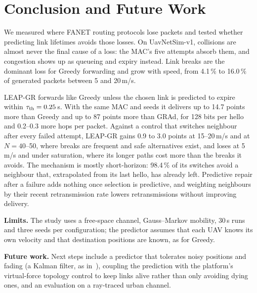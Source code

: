 \section{Conclusion and Future Work}
\label{sec:conclusion}

We measured where FANET routing protocols lose packets and tested whether predicting link lifetimes avoids
those losses. On UavNetSim-v1, collisions are almost never the final cause of a loss: the MAC's five attempts
absorb them, and congestion shows up as queueing and expiry instead. Link breaks are the dominant loss for
Greedy forwarding and grow with speed, from 4.1\,\% to 16.0\,\% of generated packets between 5 and 20\,m/s.

LEAP-GR forwards like Greedy unless the chosen link is predicted to expire within $\tau_{\mathrm{th}}=0.25$\,s. With the
same MAC and seeds it delivers up to 14.7 points more than Greedy and up to 87 points more than GRAd, for
128 bits per hello and 0.2--0.3 more hops per packet. Against a control that switches neighbour after every failed attempt, LEAP-GR gains 0.9 to 3.0 points
at 15--20\,m/s and at $N=40$--50, where breaks are frequent and safe alternatives exist, and loses at 5\,m/s
and under saturation, where its longer paths cost more than the breaks it avoids. The mechanism is mostly
short-horizon: 98.4\,\% of its switches avoid a neighbour that, extrapolated from its last hello, has already
left. Predictive repair after a failure adds nothing once selection is predictive, and weighting neighbours by
their recent retransmission rate lowers retransmissions without improving delivery.

\textbf{Limits.} The study uses a free-space channel, Gauss--Markov mobility, 30\,s runs and three seeds per
configuration; the predictor assumes that each UAV knows its own velocity and that destination positions are
known, as for Greedy.

\textbf{Future work.} Next steps include a predictor that tolerates noisy positions and fading (a Kalman
filter, as in~\cite{cui2022tarraq}), coupling the prediction with the platform's virtual-force topology
control to keep links alive rather than only avoiding dying ones, and an evaluation on a ray-traced urban
channel.
